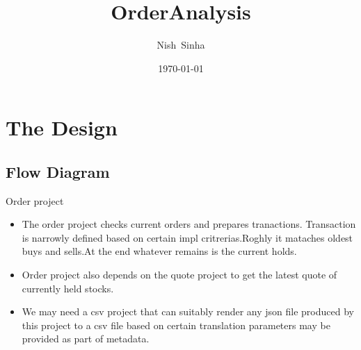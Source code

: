 \documentclass{beamer}
\title[Anomaly Detection System Overview]
{%
OrderAnalysis
%
}
\author[Sinha N]
{
  Nish~Sinha\inst{1} \and
}
\institute[Xad]
{
  \inst{1}%
  Nsinha Inc.,  CA, USA
  \and
  \vskip-2mm
}
\date[\today]
{\today}
\begin{document}
\begin{frame}
  \titlepage
\end{frame}



\section{The Design}

\subsection{Flow Diagram }

\begin{frame}{Order project}
	\begin{itemize}
		\item The order project checks current orders and prepares tranactions. Transaction is narrowly defined based on certain impl critrerias.Roghly it mataches oldest buys and sells.At the end whatever remains is the current holds.
		\item Order project also depends on the quote project to get the latest quote of currently held stocks.
		\item We may need a csv project that can suitably render any json file produced by this project to a csv file based on  certain translation parameters may be provided as part of metadata.
		
	\end{itemize}
\end{frame}
\end{document}
